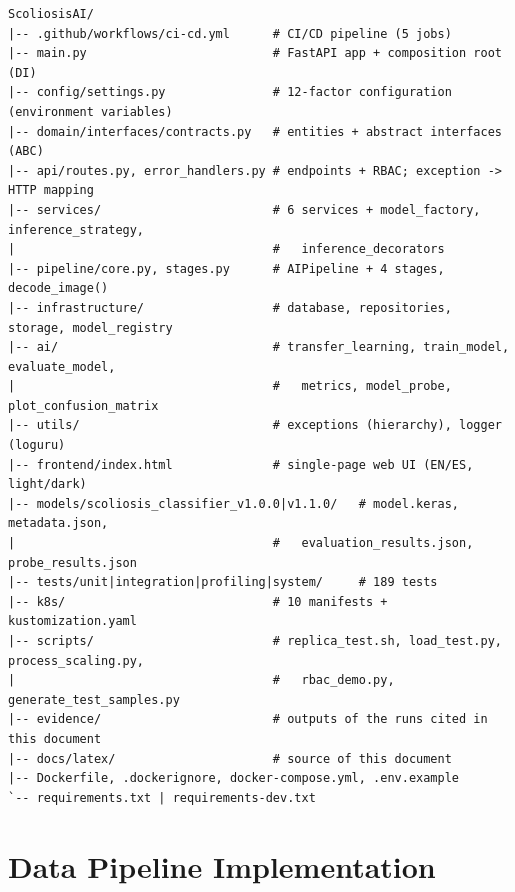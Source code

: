 \documentclass[12pt,a4paper]{article}
\begin{document}
\begin{lstlisting}[language={}, numbers=none, caption={Repository layout (version 3.3.0).}]
ScoliosisAI/
|-- .github/workflows/ci-cd.yml      # CI/CD pipeline (5 jobs)
|-- main.py                          # FastAPI app + composition root (DI)
|-- config/settings.py               # 12-factor configuration (environment variables)
|-- domain/interfaces/contracts.py   # entities + abstract interfaces (ABC)
|-- api/routes.py, error_handlers.py # endpoints + RBAC; exception -> HTTP mapping
|-- services/                        # 6 services + model_factory, inference_strategy,
|                                    #   inference_decorators
|-- pipeline/core.py, stages.py      # AIPipeline + 4 stages, decode_image()
|-- infrastructure/                  # database, repositories, storage, model_registry
|-- ai/                              # transfer_learning, train_model, evaluate_model,
|                                    #   metrics, model_probe, plot_confusion_matrix
|-- utils/                           # exceptions (hierarchy), logger (loguru)
|-- frontend/index.html              # single-page web UI (EN/ES, light/dark)
|-- models/scoliosis_classifier_v1.0.0|v1.1.0/   # model.keras, metadata.json,
|                                    #   evaluation_results.json, probe_results.json
|-- tests/unit|integration|profiling|system/     # 189 tests
|-- k8s/                             # 10 manifests + kustomization.yaml
|-- scripts/                         # replica_test.sh, load_test.py, process_scaling.py,
|                                    #   rbac_demo.py, generate_test_samples.py
|-- evidence/                        # outputs of the runs cited in this document
|-- docs/latex/                      # source of this document
|-- Dockerfile, .dockerignore, docker-compose.yml, .env.example
`-- requirements.txt | requirements-dev.txt
\end{lstlisting}

\section{Data Pipeline Implementation}
\end{document}
